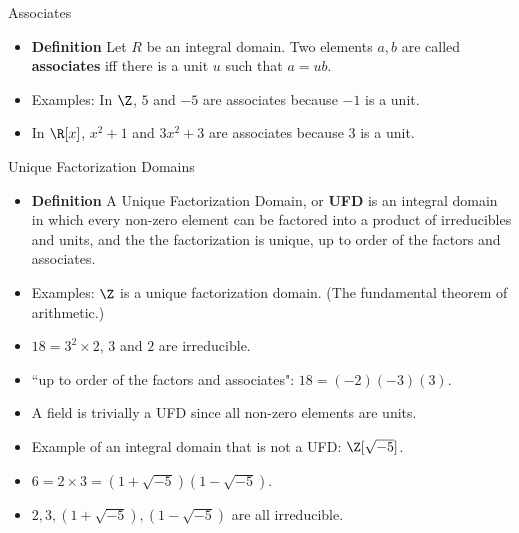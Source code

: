 \documentclass{beamer}
\begin{document}

\begin{frame}{Associates}

\begin{itemize}
  \item \textbf{Definition} Let $R$ be an integral domain. Two elements $a,b$ are called \textbf{associates} iff there is a unit $u$ such that $a=ub$.
  \item Examples: In $\Z$, $5$ and $-5$ are associates because $-1$ is a unit.
  \item In $\R[x]$, $x^2+1$ and $3x^2 +3$ are associates because $3$ is a unit.
\end{itemize}

\end{frame}


\begin{frame}{Unique Factorization Domains}

\begin{itemize}
  \item \textbf{Definition} A Unique Factorization Domain, or \textbf{UFD} is an integral domain in which every non-zero element can be factored into a product of irreducibles and units, and the the factorization is unique, up to order of the factors and associates.
  \item Examples: $\Z$ is a unique factorization domain. (The fundamental theorem of arithmetic.)
  \item $18 = 3^2 \times 2$, $3$ and $2$ are irreducible.
  \item ``up to order of the factors and associates": $18 = (-2)(-3) (3)$.
  \item A field is trivially a UFD since all non-zero elements are units.
  \item Example of an integral domain that is not a UFD: $\Z[\sqrt{-5}]$.
  \item $6 = 2\times 3 = (1+\sqrt{-5})(1-\sqrt{-5})$.
  \item $2,3,(1+\sqrt{-5}),(1-\sqrt{-5})$ are all irreducible.
\end{itemize}

\end{frame}

\end{document}
